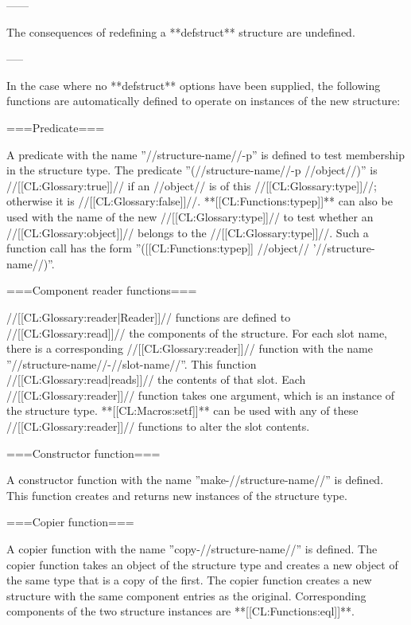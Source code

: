 \endlist

------

The consequences of redefining a **defstruct** structure are undefined.

-----

In the case where no **defstruct** options have been supplied, the following functions are automatically defined to operate on instances of the new structure:

===Predicate===

A predicate with the name ''//structure-name//-p'' is defined to test membership in the structure type. The predicate ''(//structure-name//-p //object//)'' is //[[CL:Glossary:true]]// if an //object// is of this //[[CL:Glossary:type]]//; otherwise it is //[[CL:Glossary:false]]//. **[[CL:Functions:typep]]** can also be used with the name of the new //[[CL:Glossary:type]]// to test whether an //[[CL:Glossary:object]]// belongs to the //[[CL:Glossary:type]]//. Such a function call has the form ''([[CL:Functions:typep]] //object// '//structure-name//)''.

===Component reader functions===

//[[CL:Glossary:reader|Reader]]// functions are defined to //[[CL:Glossary:read]]// the components of the structure. For each slot name, there is a corresponding //[[CL:Glossary:reader]]// function with the name ''//structure-name//-//slot-name//''. This function //[[CL:Glossary:read|reads]]// the contents of that slot. Each //[[CL:Glossary:reader]]// function takes one argument, which is an instance of the structure type. **[[CL:Macros:setf]]** can be used with any of these //[[CL:Glossary:reader]]// functions to alter the slot contents.

===Constructor function===

A constructor function with the name ''make-//structure-name//'' is defined. This function creates and returns new instances of the structure type.

===Copier function===

A copier function with the name ''copy-//structure-name//'' is defined. The copier function takes an object of the structure type and creates a new object of the same type that is a copy of the first. The copier function creates a new structure with the same component entries as the original. Corresponding components of the two structure instances are **[[CL:Functions:eql]]**. \endlist

